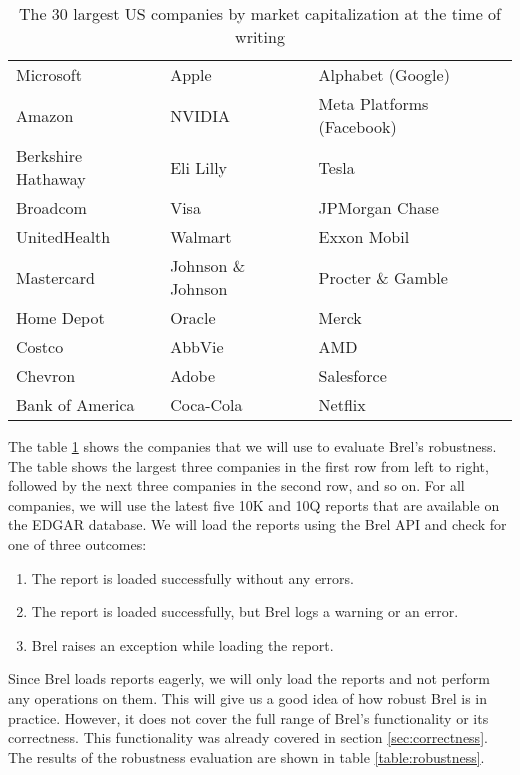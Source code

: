 \begin{table}[H]
    \centering
    \begin{tabular}{|l l l|}
        \hline
        Microsoft & Apple & Alphabet (Google) \\
        Amazon & NVIDIA & Meta Platforms (Facebook) \\
        Berkshire Hathaway & Eli Lilly & Tesla \\
        Broadcom & Visa & JPMorgan Chase \\
        UnitedHealth & Walmart & Exxon Mobil \\
        Mastercard & Johnson \& Johnson & Procter \& Gamble \\
        Home Depot & Oracle & Merck \\
        Costco & AbbVie & AMD \\
        Chevron & Adobe & Salesforce \\
        Bank of America & Coca-Cola & Netflix \\
        \hline
    \end{tabular}
    \caption{The 30 largest US companies by market capitalization at the time of writing}
    \label{table:companies}
\end{table}

The table \ref{table:companies} shows the companies that we will use to evaluate Brel's robustness.
The table shows the largest three companies in the first row from left to right, followed by the next three companies in the second row, and so on.
For all companies, we will use the latest five 10K and 10Q reports that are available on the EDGAR database\cite{sec_edgar}.
We will load the reports using the Brel API and check for one of three outcomes:

\begin{enumerate}
    \item The report is loaded successfully without any errors.
    \item The report is loaded successfully, but Brel logs a warning or an error.
    \item Brel raises an exception while loading the report.
\end{enumerate}

Since Brel loads reports eagerly, we will only load the reports and not perform any operations on them.
This will give us a good idea of how robust Brel is in practice.
However, it does not cover the full range of Brel's functionality or its correctness.
This functionality was already covered in section \ref{sec:correctness}.
The results of the robustness evaluation are shown in table \ref{table:robustness}.
